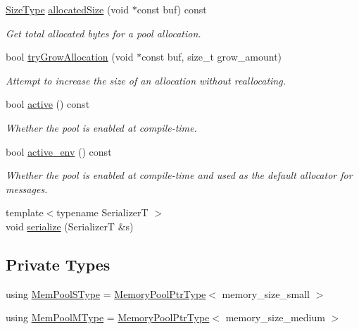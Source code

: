 \begin{DoxyCompactItemize}
\hyperlink{structvt_1_1pool_1_1_pool_a4030898e09d0160c24743a7b949c0d46}{Size\+Type} \hyperlink{structvt_1_1pool_1_1_pool_aa973879eb9a13583ba3ec5da29c77a20}{allocated\+Size} (void $\ast$const buf) const
\begin{DoxyCompactList}\small\item\em Get total allocated bytes for a pool allocation. \end{DoxyCompactList}\item 
bool \hyperlink{structvt_1_1pool_1_1_pool_a62e1e77caac8e11f24be61acd6f4474b}{try\+Grow\+Allocation} (void $\ast$const buf, size\+\_\+t grow\+\_\+amount)
\begin{DoxyCompactList}\small\item\em Attempt to increase the size of an allocation without reallocating. \end{DoxyCompactList}\item 
bool \hyperlink{structvt_1_1pool_1_1_pool_a3f34112821d767815d5049dc83503033}{active} () const
\begin{DoxyCompactList}\small\item\em Whether the pool is enabled at compile-\/time. \end{DoxyCompactList}\item 
bool \hyperlink{structvt_1_1pool_1_1_pool_aa11bdd76d9f6491ac412d5abc5c63274}{active\+\_\+env} () const
\begin{DoxyCompactList}\small\item\em Whether the pool is enabled at compile-\/time and used as the default allocator for messages. \end{DoxyCompactList}\item 
{\footnotesize template$<$typename SerializerT $>$ }\\void \hyperlink{structvt_1_1pool_1_1_pool_a7a81f11ae46f0c953c600b223bc09c70}{serialize} (SerializerT \&s)
\end{DoxyCompactItemize}
\subsection*{Private Types}
\begin{DoxyCompactItemize}
\item 
using \hyperlink{structvt_1_1pool_1_1_pool_a9f94985824d12c43357cfe50eaaefd38}{Mem\+Pool\+S\+Type} = \hyperlink{structvt_1_1pool_1_1_pool_a21e20f5b56c3bae4f0d0cc36ed9c5eee}{Memory\+Pool\+Ptr\+Type}$<$ memory\+\_\+size\+\_\+small $>$
\item 
using \hyperlink{structvt_1_1pool_1_1_pool_a8a201b9a843e47cd4e7b568a8e4483da}{Mem\+Pool\+M\+Type} = \hyperlink{structvt_1_1pool_1_1_pool_a21e20f5b56c3bae4f0d0cc36ed9c5eee}{Memory\+Pool\+Ptr\+Type}$<$ memory\+\_\+size\+\_\+medium $>$
\end{DoxyCompactItemize}
